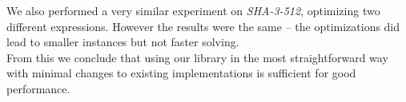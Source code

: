 \documentclass[myposter,portrait]{sciposter}
\def\mysection#1{
{\color{sectionCol}\section*{\sc\bfseries #1}}}
\begin{document}
\begin{multicols*}{3}
We also performed a very similar experiment on \emph{SHA-3-512}, optimizing two different expressions.
However the results were the same -- the optimizations did lead to smaller instances but not faster solving.
~\\

From this we conclude that using our library in the most straightforward way with minimal changes to existing implementations is sufficient for good performance.







\end{multicols*}
\end{document}

